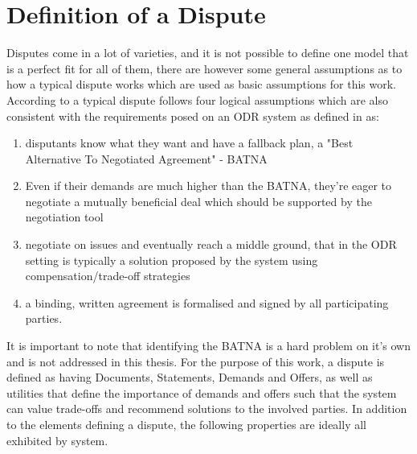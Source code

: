 \documentclass[12pt,msc,a4paper,oneside]{ucl_thesis}
\begin{document}
\section{Definition of a Dispute}
Disputes come in a lot of varieties, and it is not possible to define one model that is a perfect fit for all of them, there are however some general assumptions as to how a typical dispute works which are used as basic assumptions for this work. According to \cite{Susskind:Logic_of_mediating_values} a typical dispute follows four logical assumptions which are also consistent with the requirements posed on an ODR system as defined in \cite{Lodder:ORD_system_design} as:
\begin{enumerate}
    \item{disputants know what they want and have a fallback plan, a "Best Alternative To Negotiated Agreement" - BATNA}
    \item{Even if their demands are much higher than the BATNA, they're eager to negotiate a mutually beneficial deal which should be supported by the negotiation tool}
    \item{negotiate on issues and eventually reach a middle ground, that in the ODR setting is typically a solution proposed by the system using compensation/trade-off strategies}
    \item{a binding, written agreement is formalised and signed by all participating parties.}
\end{enumerate}
It is important to note that identifying the BATNA is a hard problem on it's own and is not addressed in this thesis. For the purpose of this work, a dispute is defined as having Documents, Statements, Demands and Offers, as well as utilities that define the importance of demands and offers such that the system can value trade-offs and recommend solutions to the involved parties. In addition to the elements defining a dispute, the following properties are ideally all exhibited by system.
\end{document}

